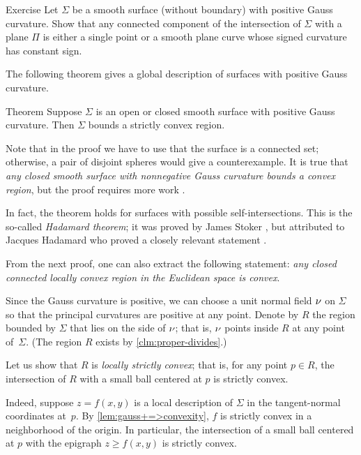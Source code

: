 \begin{thm}{Exercise}\label{ex:section-of-convex}
Let $\Sigma$ be a smooth surface (without boundary) with positive Gauss curvature.
Show that any connected component of the intersection of $\Sigma$ with a plane $\Pi$ is either a single point or a smooth plane curve whose signed curvature has constant sign.
\end{thm}

The following theorem gives a global description of surfaces with positive Gauss curvature.

\begin{thm}{Theorem}\label{thm:convex-embedded}
Suppose $\Sigma$ is an open or closed smooth surface with positive Gauss curvature.
Then $\Sigma$ bounds a strictly convex region.
\end{thm}

Note that in the proof we have to use that the surface is a connected set;
otherwise, a pair of disjoint spheres would give a counterexample.
It is true that \textit{any closed smooth surface with nonnegative Gauss curvature bounds a convex region}, but the proof requires more work \cite{hadamard,gomes}.

In fact, the theorem holds for surfaces with possible self-intersections. 
This is the so-called {}\emph{Hadamard theorem};
it was proved by James Stoker \cite{stoker}, but attributed to Jacques Hadamard who proved a closely relevant statement \cite[item 23]{hadamard}.

From the next proof, one can also extract the following statement: \textit{any closed connected locally convex region in the Euclidean space is convex}.

Since the Gauss curvature is positive, we can choose a unit normal field $\nu$ on $\Sigma$ so that the principal curvatures are positive at any point.
Denote by $R$ the region bounded by $\Sigma$ that lies on the side of $\nu$;
that is, $\nu$ points inside $R$ at any point of~$\Sigma$.
(The region $R$ exists by \ref{clm:proper-divides}.)

Let us show that $R$ is {}\emph{locally strictly convex};
that is, for any point $p\in R$, the intersection of $R$ with a small ball centered at $p$ is strictly convex.

Indeed, suppose $z=f(x,y)$ is a local description of $\Sigma$ in the tangent-normal coordinates at~$p$.
By \ref{lem:gauss+=>convexity}, $f$ is strictly convex in a neighborhood of the origin.
In particular, the intersection of a small ball centered at $p$ with the epigraph $z\ge f(x,y)$ is strictly convex.

